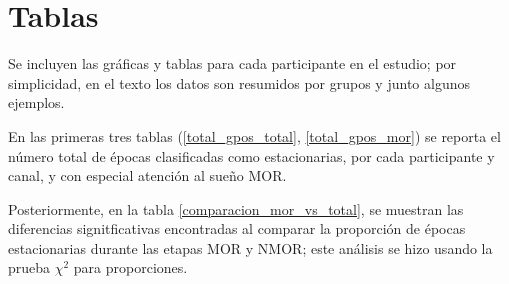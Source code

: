 
\chapter{Tablas}

Se incluyen las gráficas y tablas para cada participante en el estudio; por simplicidad, en el 
texto los datos son resumidos por grupos y junto algunos ejemplos.

En las primeras tres tablas (\ref{total_gpos_total}, \ref{total_gpos_mor}) se reporta el número 
total de épocas clasificadas como estacionarias, por cada participante y canal, y con especial
atención al sueño MOR.

Posteriormente, en la tabla \ref{comparacion_mor_vs_total}, se muestran las diferencias 
signitficativas encontradas al comparar la proporción de épocas estacionarias durante las etapas 
MOR y NMOR; este análisis se hizo usando la prueba $\chi^{2}$ para proporciones.


